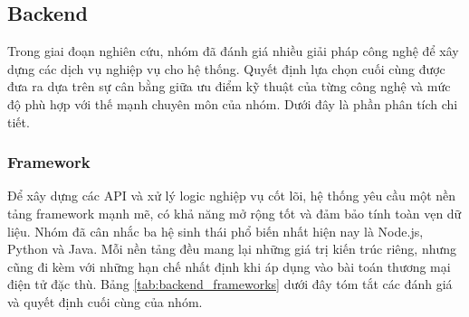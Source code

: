 \subsection{Backend}
Trong giai đoạn nghiên cứu, nhóm đã đánh giá nhiều giải pháp công nghệ để xây dựng các dịch vụ nghiệp vụ cho hệ thống. Quyết định lựa chọn cuối cùng được đưa ra dựa trên sự cân bằng giữa ưu điểm kỹ thuật của từng công nghệ và mức độ phù hợp với thế mạnh chuyên môn của nhóm. Dưới đây là phần phân tích chi tiết.

\subsubsection{Framework}

Để xây dựng các API và xử lý logic nghiệp vụ cốt lõi, hệ thống yêu cầu một nền tảng framework mạnh mẽ, có khả năng mở rộng tốt và đảm bảo tính toàn vẹn dữ liệu. Nhóm đã cân nhắc ba hệ sinh thái phổ biến nhất hiện nay là Node.js, Python và Java. Mỗi nền tảng đều mang lại những giá trị kiến trúc riêng, nhưng cũng đi kèm với những hạn chế nhất định khi áp dụng vào bài toán thương mại điện tử đặc thù. Bảng \ref{tab:backend_frameworks} dưới đây tóm tắt các đánh giá và quyết định cuối cùng của nhóm.
\setlength{\LTpre}{0pt}  %
\setlength{\LTpost}{10pt}

